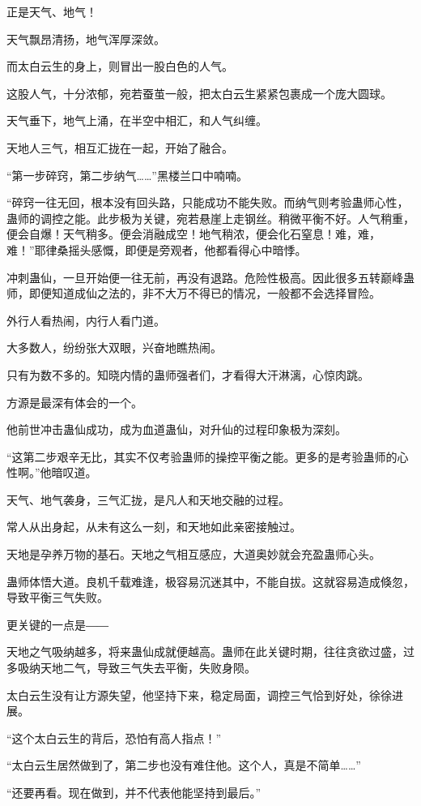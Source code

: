 \begin{this_body}
正是天气、地气！

天气飘昂清扬，地气浑厚深敛。

而太白云生的身上，则冒出一股白色的人气。

这股人气，十分浓郁，宛若蚕茧一般，把太白云生紧紧包裹成一个庞大圆球。

天气垂下，地气上涌，在半空中相汇，和人气纠缠。

天地人三气，相互汇拢在一起，开始了融合。

“第一步碎窍，第二步纳气……”黑楼兰口中喃喃。

“碎窍一往无回，根本没有回头路，只能成功不能失败。而纳气则考验蛊师心性，蛊师的调控之能。此步极为关键，宛若悬崖上走钢丝。稍微平衡不好。人气稍重，便会自爆！天气稍多。便会消融成空！地气稍浓，便会化石窒息！难，难，难！”耶律桑摇头感慨，即便是旁观者，他都看得心中暗悸。

冲刺蛊仙，一旦开始便一往无前，再没有退路。危险性极高。因此很多五转巅峰蛊师，即便知道成仙之法的，非不大万不得已的情况，一般都不会选择冒险。

外行人看热闹，内行人看门道。

大多数人，纷纷张大双眼，兴奋地瞧热闹。

只有为数不多的。知晓内情的蛊师强者们，才看得大汗淋漓，心惊肉跳。

方源是最深有体会的一个。

他前世冲击蛊仙成功，成为血道蛊仙，对升仙的过程印象极为深刻。

“这第二步艰辛无比，其实不仅考验蛊师的操控平衡之能。更多的是考验蛊师的心性啊。”他暗叹道。

天气、地气袭身，三气汇拢，是凡人和天地交融的过程。

常人从出身起，从未有这么一刻，和天地如此亲密接触过。

天地是孕养万物的基石。天地之气相互感应，大道奥妙就会充盈蛊师心头。

蛊师体悟大道。良机千载难逢，极容易沉迷其中，不能自拔。这就容易造成倏忽，导致平衡三气失败。

更关键的一点是――

天地之气吸纳越多，将来蛊仙成就便越高。蛊师在此关键时期，往往贪欲过盛，过多吸纳天地二气，导致三气失去平衡，失败身陨。

太白云生没有让方源失望，他坚持下来，稳定局面，调控三气恰到好处，徐徐进展。

“这个太白云生的背后，恐怕有高人指点！”

“太白云生居然做到了，第二步也没有难住他。这个人，真是不简单……”

“还要再看。现在做到，并不代表他能坚持到最后。”


\end{this_body}
